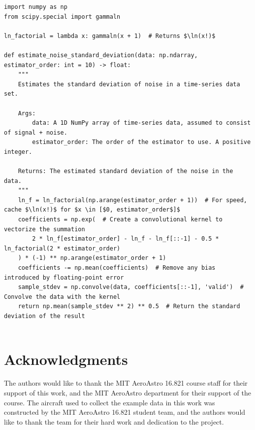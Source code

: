 \begin{listing}[H]
    \begin{verbatim}
import numpy as np
from scipy.special import gammaln

ln_factorial = lambda x: gammaln(x + 1)  # Returns $\ln(x!)$

def estimate_noise_standard_deviation(data: np.ndarray, estimator_order: int = 10) -> float:
    """
    Estimates the standard deviation of noise in a time-series data set.

    Args:
        data: A 1D NumPy array of time-series data, assumed to consist of signal + noise.
        estimator_order: The order of the estimator to use. A positive integer.

    Returns: The estimated standard deviation of the noise in the data.
    """
    ln_f = ln_factorial(np.arange(estimator_order + 1))  # For speed, cache $\ln(x!)$ for $x \in [$0, estimator_order$]$
    coefficients = np.exp(  # Create a convolutional kernel to vectorize the summation
        2 * ln_f[estimator_order] - ln_f - ln_f[::-1] - 0.5 * ln_factorial(2 * estimator_order)
    ) * (-1) ** np.arange(estimator_order + 1)
    coefficients -= np.mean(coefficients)  # Remove any bias introduced by floating-point error
    sample_stdev = np.convolve(data, coefficients[::-1], 'valid')  # Convolve the data with the kernel
    return np.mean(sample_stdev ** 2) ** 0.5  # Return the standard deviation of the result


    \end{verbatim}
    \caption{Example efficient implementation of the arbitrary-order noise estimator using NumPy/SciPy in Python 3.}
    \label{listing:efficient_arbitrary_order_noise_estimator}
\end{listing}

\section*{Acknowledgments}
The authors would like to thank the MIT AeroAstro 16.821 course staff for their support of this work, and the MIT AeroAstro department for their support of the course. The aircraft used to collect the example data in this work was constructed by the MIT AeroAstro 16.821 student team, and the authors would like to thank the team for their hard work and dedication to the project.

%    
